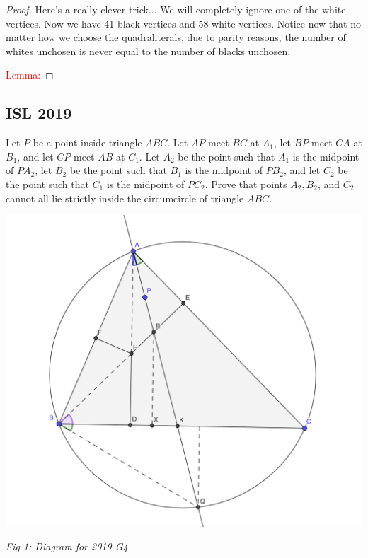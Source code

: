 \documentclass{article}
\theoremstyle{mytheoremstyle}
\theoremstyle{mytheoremstyle}
\theoremstyle{myproblemstyle}
\begin{document}
    \begin{proof}
    Here's a really clever trick... We will completely ignore one of the white vertices. Now we have 41 black vertices and 58 white vertices. Notice now that no matter how we choose the quadraliterals, due to parity reasons, the number of whites unchosen is never equal to the number of blacks unchosen. 
    
    \textcolor{red}{Lemma:} 
    \end{proof}

    \subsection{ISL 2019}

    \begin{problem}[2019 G4]
        Let $P$ be a point inside triangle $ABC$. Let $AP$ meet $BC$ at $A_1$, let $BP$ meet $CA$ at $B_1$, and let $CP$ meet $AB$ at $C_1$. Let $A_2$ be the point such that $A_1$ is the midpoint of $PA_2$, let $B_2$ be the point such that $B_1$ is the midpoint of $PB_2$, and let $C_2$ be the point such that $C_1$ is the midpoint of $PC_2$. Prove that points $A_2, B_2$, and $C_2$ cannot all lie strictly inside the circumcircle of triangle $ABC$.
    \end{problem}


    \begin{center}
        \includegraphics[scale=0.4]{2019 G4.png}

        \textit{Fig 1: Diagram for 2019 G4}
    \end{center}
\end{document}
